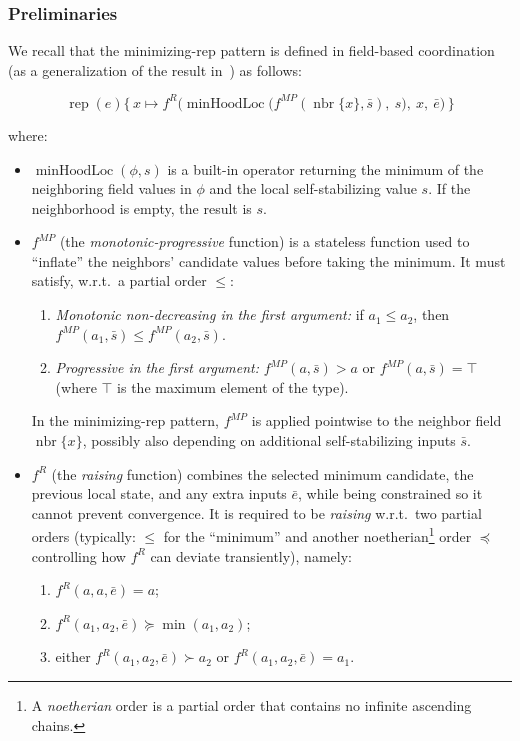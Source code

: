 \documentclass[runningheads]{llncs}
\begin{document}
\subsubsection{Preliminaries}

We recall that the minimizing-rep pattern is defined in field-based coordination (as a generalization of the result in~\cite{VD-COORD2014-LNCS2014}) as follows:

\begin{equation}
    \operatorname{rep}(e)\{\,x \mapsto
    f^{R}\big(
    \operatorname{minHoodLoc}\big(
    f^{MP}(\operatorname{nbr}\{x\}, \bar{s}),\ s
    \big),\ x,\ \bar{e}
    \big)
    \,\}
\end{equation}

where:
\begin{itemize}
    \item $\operatorname{minHoodLoc}(\phi,s)$ is a built-in operator returning the minimum of the
    neighboring field values in $\phi$ and the local self-stabilizing value $s$.
    If the neighborhood is empty, the result is $s$.

    \item $f^{MP}$ (the \emph{monotonic-progressive} function) is a stateless function used to ``inflate'' the
    neighbors’ candidate values before taking the minimum.
    It must satisfy, w.r.t.\ a partial order $\le$:
    \begin{enumerate}
        \item \emph{Monotonic non-decreasing in the first argument:}
        if $a_1 \le a_2$, then \\$f^{MP}(a_1,\bar{s}) \le f^{MP}(a_2,\bar{s})$.
        \item \emph{Progressive in the first argument:}
        $f^{MP}(a,\bar{s}) > a$ or $f^{MP}(a,\bar{s})=\top$ (where $\top$ is the maximum element of the type).
    \end{enumerate}
    In the minimizing-rep pattern, $f^{MP}$ is applied pointwise to the neighbor field $\operatorname{nbr}\{x\}$,
    possibly also depending on additional self-stabilizing inputs $\bar{s}$.

    \item $f^{R}$ (the \emph{raising} function) combines the selected minimum candidate, the previous local state,
    and any extra inputs $\bar{e}$, while being constrained so it cannot prevent convergence.
    It is required to be \emph{raising} w.r.t.\ two partial orders (typically: $\le$ for the “minimum” and another
    noetherian\footnote{
        A \emph{noetherian} order is a partial order that contains no infinite ascending chains.
    } order $\preceq$ controlling how $f^{R}$ can deviate transiently), namely:
    \begin{enumerate}
        \item $f^{R}(a,a,\bar{e}) = a$;
        \item $f^{R}(a_1,a_2,\bar{e}) \succeq \min(a_1,a_2)$;
        \item either $f^{R}(a_1,a_2,\bar{e}) \succ a_2$ or $f^{R}(a_1,a_2,\bar{e}) = a_1$.
    \end{enumerate}
\end{itemize}
\end{document}
